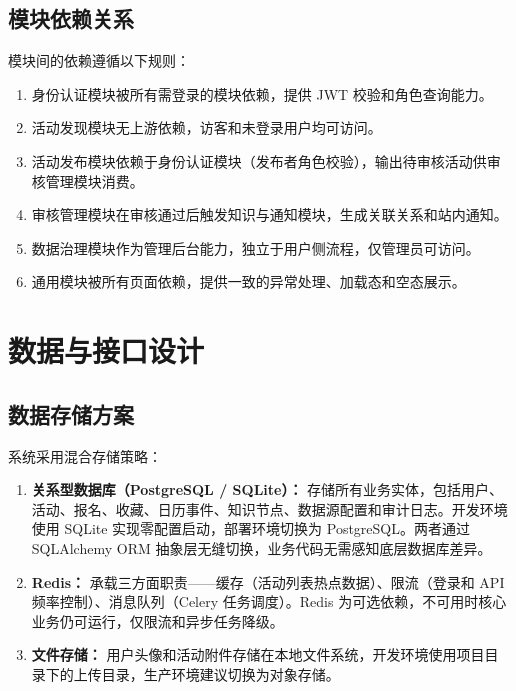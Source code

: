 \documentclass[12pt,a4paper]{ctexart}
\begin{document}
\subsection{模块依赖关系}
模块间的依赖遵循以下规则：
\begin{enumerate}
\item 身份认证模块被所有需登录的模块依赖，提供 JWT 校验和角色查询能力。
\item 活动发现模块无上游依赖，访客和未登录用户均可访问。
\item 活动发布模块依赖于身份认证模块（发布者角色校验），输出待审核活动供审核管理模块消费。
\item 审核管理模块在审核通过后触发知识与通知模块，生成关联关系和站内通知。
\item 数据治理模块作为管理后台能力，独立于用户侧流程，仅管理员可访问。
\item 通用模块被所有页面依赖，提供一致的异常处理、加载态和空态展示。
\end{enumerate}

\section{数据与接口设计}
\subsection{数据存储方案}
系统采用混合存储策略：
\begin{enumerate}
\item \textbf{关系型数据库（PostgreSQL / SQLite）：} 存储所有业务实体，包括用户、活动、报名、收藏、日历事件、知识节点、数据源配置和审计日志。开发环境使用 SQLite 实现零配置启动，部署环境切换为 PostgreSQL。两者通过 SQLAlchemy ORM 抽象层无缝切换，业务代码无需感知底层数据库差异。
\item \textbf{Redis：} 承载三方面职责——缓存（活动列表热点数据）、限流（登录和 API 频率控制）、消息队列（Celery 任务调度）。Redis 为可选依赖，不可用时核心业务仍可运行，仅限流和异步任务降级。
\item \textbf{文件存储：} 用户头像和活动附件存储在本地文件系统，开发环境使用项目目录下的上传目录，生产环境建议切换为对象存储。
\end{enumerate}
\end{document}
